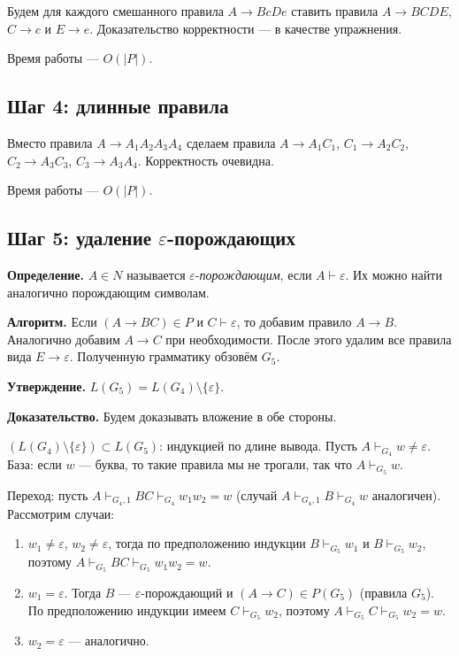 Будем для каждого смешанного правила $A \to BcDe$ ставить правила $A \to BCDE$, $C \to c$ и $E \to e$.
Доказательство корректности --- в качестве упражнения.

Время работы --- $O(|P|)$.

\subsection{Шаг 4: длинные правила}
Вместо правила $A \to A_1A_2A_3A_4$ сделаем правила $A \to A_1C_1$, $C_1 \to A_2C_2$, $C_2 \to A_3C_3$, $C_3 \to A_3A_4$.
Корректность очевидна.

Время работы --- $O(|P|)$.

\subsection{Шаг 5: удаление $\varepsilon$-порождающих}
\textbf{Определение.} $A \in N$ называется $\varepsilon$-\textit{порождающим}, если $A \vdash \varepsilon$.
Их можно найти аналогично порождающим символам.

\textbf{Алгоритм.} Если $(A \to BC) \in P$ и $C \vdash \varepsilon$, то добавим правило $A \to  B$. Аналогично добавим $A \to C$ при необходимости.
После этого удалим все правила вида $E \to \varepsilon$.
Полученную грамматику обзовём $G_5$.

\textbf{Утверждение.} $L(G_5) = L(G_4) \setminus \{\varepsilon\}$.

\textbf{Доказательство.} Будем доказывать вложение в обе стороны.

$(L(G_4) \setminus \{\varepsilon\}) \subset L(G_5)$: индукцией по длине вывода.
Пусть $A \vdash_{G_4} w \ne \varepsilon$.
База: если $w$ --- буква, то такие правила мы не трогали, так что $A \vdash_{G_5} w$.

Переход: пусть $A \vdash_{G_4, 1} BC \vdash_{G_4} w_1 w_2 = w$ (случай $A \vdash_{G_4, 1} B \vdash_{G_4} w$ аналогичен).
Рассмотрим случаи:
\begin{enumerate}
    \item $w_1 \ne \varepsilon$, $w_2 \ne \varepsilon$, тогда по предположению индукции $B \vdash_{G_5} w_1$ и $B \vdash_{G_5} w_2$, поэтому $A \vdash_{G_5} BC \vdash_{G_5} w_1w_2 = w$.
    \item $w_1 = \varepsilon$. Тогда $B$ --- $\varepsilon$-порождающий и $(A \to C) \in P(G_5)$ (правила $G_5$). 
        По предположению индукции имеем $C \vdash_{G_5} w_2$, поэтому $A \vdash_{G_5} C \vdash_{G_5} w_2 = w$.
    \item $w_2 = \varepsilon$ --- аналогично.
\end{enumerate}

